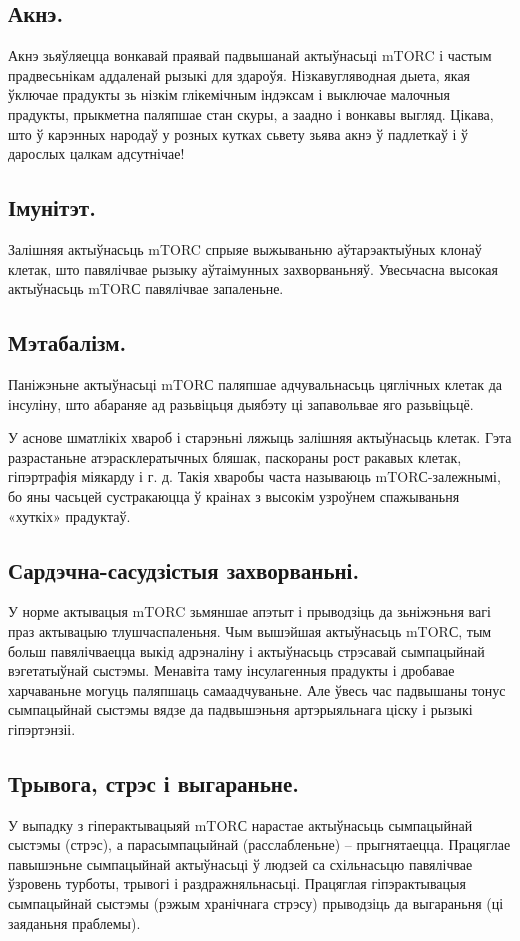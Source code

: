 \subsection{Акнэ.}
Акнэ зьяўляецца вонкавай праявай падвышанай актыўнасьці mTORC і частым прадвесьнікам аддаленай рызыкі для здароўя. Нізкавугляводная дыета, якая ўключае прадукты зь нізкім глікемічным індэксам і выключае малочныя прадукты, прыкметна паляпшае стан скуры, а заадно і вонкавы выгляд. Цікава, што ў карэнных народаў у розных кутках сьвету зьява акнэ ў падлеткаў і ў дарослых цалкам адсутнічае!

\subsection{Імунітэт.}
Залішняя актыўнасьць mTORC спрыяе выжываньню аўтарэактыўных клонаў клетак, што павялічвае рызыку аўтаімунных захворваньняў. Увесьчасна высокая актыўнасьць mTORС павялічвае запаленьне.

\subsection{Мэтабалізм.}
Паніжэньне актыўнасьці mTORС паляпшае адчувальнасьць цяглічных клетак да інсуліну, што абараняе ад разьвіцьця дыябэту ці запавольвае яго разьвіцьцё.

У аснове шматлікіх хвароб і старэньні ляжыць залішняя актыўнасьць клетак. Гэта разрастаньне атэрасклератычных бляшак, паскораны рост ракавых клетак, гіпэртрафія міякарду і г. д. Такія хваробы часта называюць mTORС-залежнымі, бо яны часьцей сустракаюцца ў краінах з высокім узроўнем спажываньня «хуткіх» прадуктаў.

\subsection{Сардэчна-сасудзістыя захворваньні.}
У норме актывацыя mTORC зьмяншае апэтыт і прыводзіць да зьніжэньня вагі праз актывацыю тлушчаспаленьня. Чым вышэйшая актыўнасьць mTORС, тым больш павялічваецца выкід адрэналіну і актыўнасьць стрэсавай сымпацыйнай вэгетатыўнай сыстэмы. Менавіта таму інсулагенныя прадукты і дробавае харчаваньне могуць паляпшаць самаадчуваньне. Але ўвесь час падвышаны тонус сымпацыйнай сыстэмы вядзе да падвышэньня артэрыяльнага ціску і рызыкі гіпэртэнзіі.

\subsection{Трывога, стрэс і выгараньне.}
У выпадку з гіперактывацыяй mTORС нарастае актыўнасьць сымпацыйнай сыстэмы (стрэс), а парасымпацыйнай (расслабленьне) – прыгнятаецца. Працяглае павышэньне сымпацыйнай актыўнасьці ў людзей са схільнасьцю павялічвае ўзровень турботы, трывогі і раздражняльнасьці. Працяглая гіпэрактывацыя сымпацыйнай сыстэмы (рэжым хранічнага стрэсу) прыводзіць да выгараньня (ці заяданьня праблемы).

